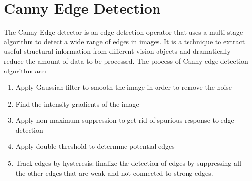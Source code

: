     \section{ Canny Edge Detection}
The Canny Edge detector is an edge detection operator that uses a multi-stage algorithm to detect a wide range of edges in images. It is a technique to extract useful structural information from different vision objects and dramatically reduce the amount of data to be processed. The process of Canny edge detection algorithm are:
        \begin{enumerate}
        \item Apply Gaussian filter to smooth the image in order to remove the noise
        \item Find the intensity gradients of the image
        \item Apply non-maximum suppression to get rid of spurious response to edge detection
        \item Apply double threshold to determine potential edges
        \item Track edges by hysteresis: finalize the detection of edges by suppressing all the other edges that are weak and not connected to strong edges.
        \end{enumerate}
